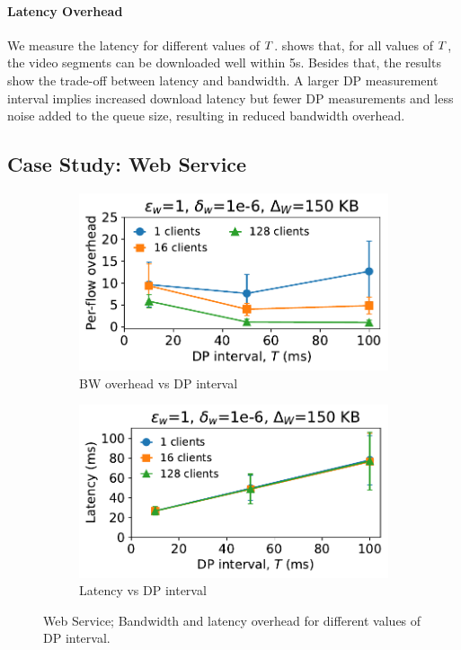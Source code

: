 \paragraph{Latency Overhead}
We measure the latency for different values of $T$.
 shows that, for all values of $T$, the video segments can be downloaded well within 5s. 
Besides that, the results show the trade-off between latency and bandwidth.
A larger DP measurement interval implies increased download latency but fewer DP measurements and less noise added to the queue size, resulting in reduced bandwidth overhead.







\subsection{Case Study: Web Service}\label{subsec:eval-bw-web}
\begin{figure}[t]
  \centering
  \begin{subfigure}{0.49\columnwidth}
      \centering
      \includegraphics[width=\textwidth]{plots/overhead_vs_dp_interval_web.pdf}
      \caption{BW overhead vs DP interval}
      \label{fig:web-overhead-vs-dpInt}
  \end{subfigure}
  \hfill
  \begin{subfigure}{0.49\columnwidth}
      \centering
      \includegraphics[width=\textwidth]{plots/latency_vs_dp_interval_web.pdf}
      \caption{Latency vs DP interval}
      \label{fig:web-latency-vs-dpInt}
  \end{subfigure}
  \caption{Web Service; Bandwidth and latency overhead for different values of DP interval.
  }
\end{figure}
